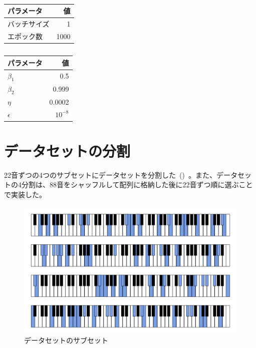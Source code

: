 \begin{table}[h]
\centering
\begin{minipage}{0.49\columnwidth}
    \centering
        \begin{tabular}{lr}\toprule
            パラメータ & 値 \\ \midrule
            バッチサイズ & 1 \\ 
            エポック数 & 1000 \\ \bottomrule
        \end{tabular}
    \caption{}
    \label{tab:params1}
\end{minipage}
\begin{minipage}{0.49\columnwidth}
    \centering
        \begin{tabular}{lr}\toprule
            パラメータ & 値 \\ \midrule
            $\beta_1$ & 0.5 \\
            $\beta_2$ & 0.999 \\
            $\eta$ & 0.0002 \\ 
            $\epsilon$ & $10^{-8}$ \\ \bottomrule
        \end{tabular}
    \caption{}
    \label{tab:params2}
\end{minipage}
\end{table}

\chapter{データセットの分割}
\label{app:split}

22音ずつの4つのサブセットにデータセットを分割した~()~。また、データセットの4分割は、88音をシャッフルして配列に格納した後に22音ずつ順に選ぶことで実装した。

\begin{figure}[h]
\centering
\includegraphics[width=\columnwidth]{figure/data_div.png}
\caption[]{データセットのサブセット}
\label{fig:data_div}
\end{figure}

